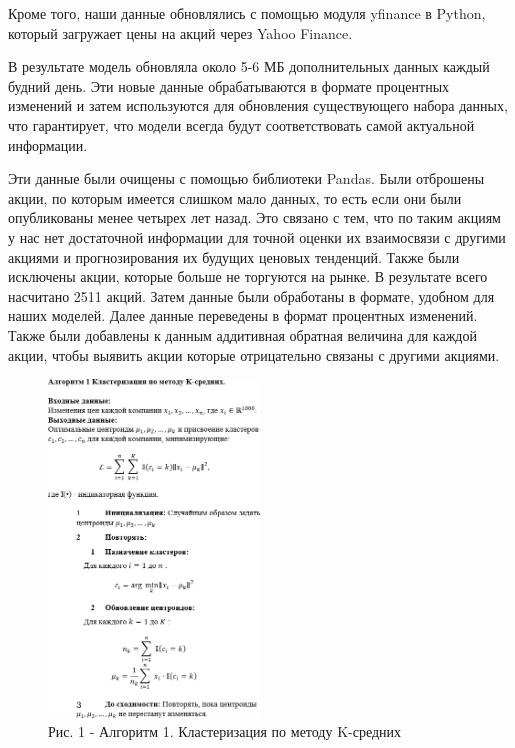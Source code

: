 \begin{multicols}{2}
Кроме того, наши данные обновлялись с помощью модуля yfinance в Python,
который загружает цены на акций через Yahoo Finance.

В результате модель обновляла около 5-6 МБ дополнительных данных каждый
будний день. Эти новые данные обрабатываются в формате процентных
изменений и затем используются для обновления существующего набора
данных, что гарантирует, что модели всегда будут соответствовать самой
актуальной информации.

Эти данные были очищены с помощью библиотеки Pandas. Были отброшены
акции, по которым имеется слишком мало данных, то есть если они были
опубликованы менее четырех лет назад. Это связано с тем, что по таким
акциям у нас нет достаточной информации для точной оценки их взаимосвязи
с другими акциями и прогнозирования их будущих ценовых тенденций. Также
были исключены акции, которые больше не торгуются на рынке. В результате
всего насчитано 2511 акций. Затем данные были обработаны в формате,
удобном для наших моделей. Далее данные переведены в формат процентных
изменений. Также были добавлены к данным аддитивная обратная величина
для каждой акции, чтобы выявить акции которые отрицательно связаны с
другими акциями.
\end{multicols}

\begin{figure}[H]
	\centering
	\includegraphics[width=0.5\textwidth]{media/ict2/image3}
	\caption*{Рис. 1 - Алгоритм 1. Кластеризация по методу K-средних}
\end{figure}

